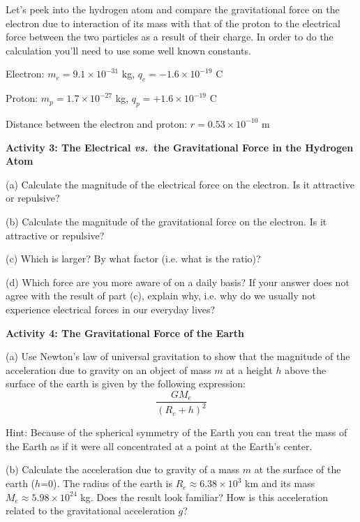 Let's peek into the hydrogen atom and compare the gravitational force on the
electron due to interaction of its mass with that of the proton to the electrical
force between the two particles as a result of their charge. In order to do
the calculation you'll need to use some well known constants.

Electron: \(m_{e}  = 9.1 \times 10^{-31} \) kg, \( q_{e}  = - 1.6 
\times 10^{-19} \)
C 

Proton: \( m_{p}  = 1.7 \times 10^{-27} \) kg, \( q_{p}  = +1.6 \times 10^{-19} \)
C 

Distance between the electron and proton: \(r = 0.53 \times 10^{-10} \) m

\textbf{Activity 3: The Electrical \textit{vs.}~the Gravitational Force in the Hydrogen
Atom}

(a) Calculate the magnitude of the electrical force on the electron. Is it attractive
or repulsive?
\answerspace{20mm}

(b) Calculate the magnitude of the gravitational force on the electron. Is it
attractive or repulsive?
\answerspace{20mm}

(c) Which is larger? By what factor (i.e. what is the ratio)?
\answerspace{20mm}

(d) Which force are you more aware of on a daily basis? If your answer does
not agree with the result of part (c), explain why, i.e. why do we usually not 
experience electrical forces in our everyday lives?
\answerspace{20mm}

\textbf{Activity 4: The Gravitational Force of the Earth}

(a) Use Newton's law of universal gravitation to show that the magnitude of the acceleration due to gravity
on an object of mass $m$ at a height $h$ above the surface of the earth is given by
the following expression:
\[
\frac{GM_{e}}{\left( R_{e}+h\right) ^{2}}\]

Hint: Because of the spherical symmetry of the Earth you can treat the mass
of the Earth as if it were all concentrated at a point at the Earth's center.
\answerspace{20mm}
\pagebreak

(b) Calculate the acceleration due to gravity of a mass $m$ at the surface of
the earth ($h$=0). The radius of the earth is \( R_{e}  \approx   6.38
\times 10^{3} \) km and its mass \( M_{e}  \approx  5.98 \times 10^{24} \)
kg. Does the result look familiar? How is this acceleration related to the gravitational
acceleration $g$?
\vspace{40mm}

